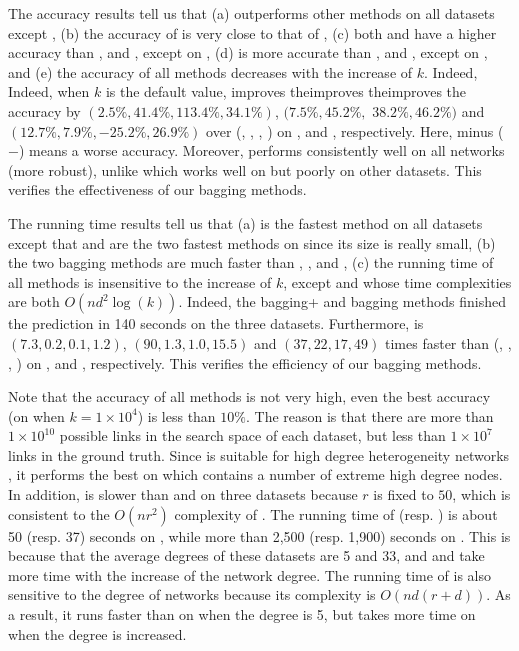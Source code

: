 The accuracy results tell us that (a) \Biased outperforms other methods on all datasets except \Wikipedia, (b) the accuracy of \Biasedp is very close to that of \Biased, (c) both \Biased and \Biasedp have a higher accuracy than \Aa, \RA and \BIGCLAM, except \RA on \Wikipedia,
(d) \NMF is more accurate than \Aa, \RA and \BIGCLAM, except \RA on \Wikipedia,
and (e) the accuracy of all methods decreases with the increase of $k$.
Indeed, Indeed, when $k$ is the default value, \Biased improves the\Biased improves the\Biased improves the accuracy by $(2.5\%, 41.4\%, 113.4\%, 34.1\%)$, $(7.5\%, 45.2\%,$ $ 38.2\%, 46.2\%)$
and $(12.7\%, 7.9\%, -25.2\%, 26.9\%)$ over (\NMF, \Aa, \RA, \BIGCLAM) on \Digg, \YouTube and \Wikipedia,
respectively. Here, minus ($-$) means a worse accuracy. Moreover, \Biased performs consistently well on all networks (\ie more robust), unlike \RA which works well
on \Wikipedia but poorly on other datasets. This verifies the effectiveness of our bagging methods.

The running time results tell us that (a) \Biasedp is the fastest method on all
datasets except that \Aa and \RA are the two fastest methods on \Digg since its size is really
small, (b) the two bagging methods are much faster than \NMF, \Aa,  \RA and \BIGCLAM,
(c) the running time of all methods is insensitive to the increase of $k$,
except \Aa and \RA whose time complexities are both $O(nd^2\log(k))$.
Indeed, the bagging+ and bagging methods finished the prediction in 140 seconds on the three datasets.
Furthermore, \Biasedp is $(7.3, 0.2, 0.1, 1.2)$, $(90, 1.3, 1.0, 15.5)$ and $(37, 22, 17, 49)$
times faster than (\NMF, \Aa, \RA, \BIGCLAM) on
\Digg, \YouTube and \Wikipedia, respectively.
This verifies the efficiency of our bagging methods.


Note that the accuracy of all methods is not very high, even the best
accuracy (\Biasedp on \Digg when $k = 1\times 10^4$) is less than $10\%$. The reason is that
there are more than $1\times 10^{10}$ possible links in the search space of each dataset,
but less than $1\times 10^7$ links in the ground truth.
Since \RA is suitable for high degree heterogeneity networks \cite{zhou2009},
it performs the best on \Wikipedia which contains a number of extreme high degree nodes.
In addition, \NMF is slower than \Aa and \RA on three datasets because $r$ is fixed to $50$,
which is consistent to the $O(nr^2)$ complexity of \NMF.
The running time of \Aa (resp. \RA) is about 50 (resp. 37) seconds on \YouTube,
while more than 2,500 (resp. 1,900) seconds on \Wikipedia.
This is because that the average degrees of these datasets are 5 and 33,
and \Aa  and \RA take more time with the increase of the network degree.
The running time of \BIGCLAM is also sensitive to the degree of
networks because its complexity is $O(nd(r + d))$.
As a result, it runs faster than
\NMF on \YouTube when the degree is 5, but takes more time on \Wikipedia
when the degree is increased.








